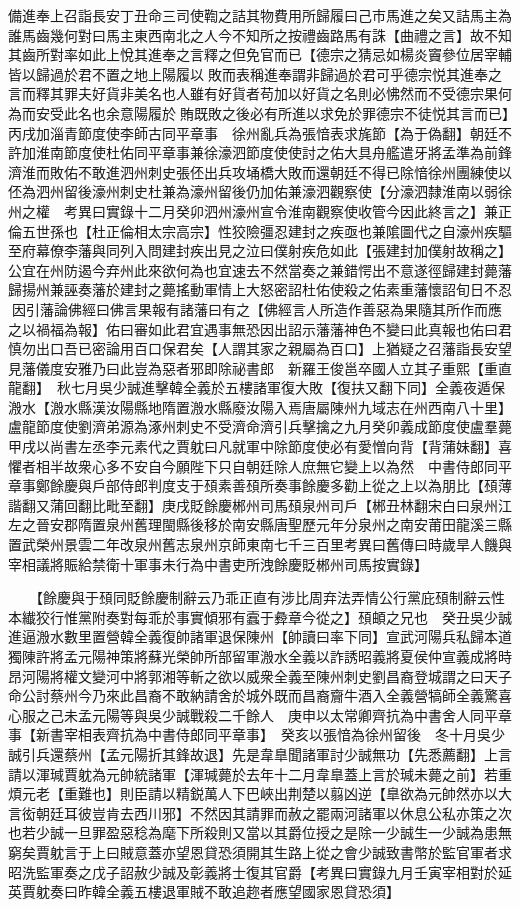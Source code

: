 備進奉上召詣長安丁丑命三司使鞫之詰其物費用所歸履曰己市馬進之矣又詰馬主為誰馬齒幾何對曰馬主東西南北之人今不知所之按禮齒路馬有誅【曲禮之言】故不知其齒所對率如此上悅其進奉之言釋之但免官而已【德宗之猜忌如楊炎竇參位居宰輔皆以歸過於君不置之地上陽履以敗而表稱進奉謂非歸過於君可乎德宗悦其進奉之言而釋其罪夫好貨非美名也人雖有好貨者苟加以好貨之名則必怫然而不受德宗果何為而安受此名也余意陽履於賄既敗之後必有所進以求免於罪德宗不徒悦其言而已】　丙戌加淄青節度使李師古同平章事　徐州亂兵為張愔表求旄節【為于偽翻】朝廷不許加淮南節度使杜佑同平章事兼徐濠泗節度使使討之佑大具舟艦遣牙將孟準為前鋒濟淮而敗佑不敢進泗州刺史張伾出兵攻埇橋大敗而還朝廷不得已除愔徐州團練使以伾為泗州留後濠州刺史杜兼為濠州留後仍加佑兼濠泗觀察使【分濠泗隸淮南以弱徐州之權　考異曰實錄十二月癸卯泗州濠州宣令淮南觀察使收管今因此終言之】兼正倫五世孫也【杜正倫相太宗高宗】性狡險彊忍建封之疾亟也兼隂圖代之自濠州疾驅至府幕僚李藩與同列入問建封疾出見之泣曰僕射疾危如此【張建封加僕射故稱之】公宜在州防遏今弃州此來欲何為也宜速去不然當奏之兼錯愕出不意遂徑歸建封薨藩歸揚州兼誣奏藩於建封之薨搖動軍情上大怒密詔杜佑使殺之佑素重藩懷詔旬日不忍因引藩論佛經曰佛言果報有諸藩曰有之【佛經言人所造作善惡為果隨其所作而應之以禍福為報】佑曰審如此君宜遇事無恐因出詔示藩藩神色不變曰此真報也佑曰君慎勿出口吾已密論用百口保君矣【人謂其家之親屬為百口】上猶疑之召藩詣長安望見藩儀度安雅乃曰此豈為惡者邪即除祕書郎　新羅王俊邕卒國人立其子重熙【重直龍翻】　秋七月吳少誠進擊韓全義於五樓諸軍復大敗【復扶又翻下同】全義夜遁保溵水【溵水縣漢汝陽縣地隋置溵水縣廢汝陽入焉唐屬陳州九域志在州西南八十里】　盧龍節度使劉濟弟源為涿州刺史不受濟命濟引兵擊擒之九月癸卯義成節度使盧羣薨甲戌以尚書左丞李元素代之賈躭曰凡就軍中除節度使必有愛憎向背【背蒲妹翻】喜懼者相半故衆心多不安自今願陛下只自朝廷除人庶無它變上以為然　中書侍郎同平章事鄭餘慶與戶部侍郎判度支于䪹素善䪹所奏事餘慶多勸上從之上以為朋比【䪹薄諧翻又蒲回翻比毗至翻】庚戌貶餘慶郴州司馬䪹泉州司戶【郴丑林翻宋白曰泉州江左之晉安郡隋置泉州舊理閩縣後移於南安縣唐聖歷元年分泉州之南安莆田龍溪三縣置武榮州景雲二年改泉州舊志泉州京師東南七千三百里考異曰舊傳曰時歲旱人饑與宰相議將賑給禁衛十軍事未行為中書吏所洩餘慶貶郴州司馬按實錄】

　　【餘慶與于䪹同貶餘慶制辭云乃乖正直有涉比周弃法弄情公行黨庇䪹制辭云性本纎狡行惟黨附奏對每乖於事實傾邪有蠧于彜章今從之】䪹頔之兄也　癸丑吳少誠進逼溵水數里置營韓全義復帥諸軍退保陳州【帥讀曰率下同】宣武河陽兵私歸本道獨陳許將孟元陽神策將蘇光榮帥所部留軍溵水全義以詐誘昭義將夏侯仲宣義成將時昂河陽將權文變河中將郭湘等斬之欲以威衆全義至陳州刺史劉昌裔登城謂之曰天子命公討蔡州今乃來此昌裔不敢納請舍於城外既而昌裔齎牛酒入全義營犒師全義驚喜心服之己未孟元陽等與吳少誠戰殺二千餘人　庚申以太常卿齊抗為中書舍人同平章事【新書宰相表齊抗為中書侍郎同平章事】　癸亥以張愔為徐州留後　冬十月吳少誠引兵還蔡州【孟元陽折其鋒故退】先是韋臯聞諸軍討少誠無功【先悉薦翻】上言請以渾瑊賈躭為元帥統諸軍【渾瑊薨於去年十二月韋臯蓋上言於瑊未薨之前】若重煩元老【重難也】則臣請以精鋭萬人下巴峽出荆楚以翦凶逆【臯欲為元帥然亦以大言衒朝廷耳彼豈肯去西川邪】不然因其請罪而赦之罷兩河諸軍以休息公私亦策之次也若少誠一旦罪盈惡稔為麾下所殺則又當以其爵位授之是除一少誠生一少誠為患無窮矣賈躭言于上曰賊意蓋亦望恩貸恐須開其生路上從之會少誠致書幣於監官軍者求昭洗監軍奏之戊子詔赦少誠及彰義將士復其官爵【考異曰實錄九月壬寅宰相對於延英賈躭奏曰昨韓全義五樓退軍賊不敢追趂者應望國家恩貸恐須】

